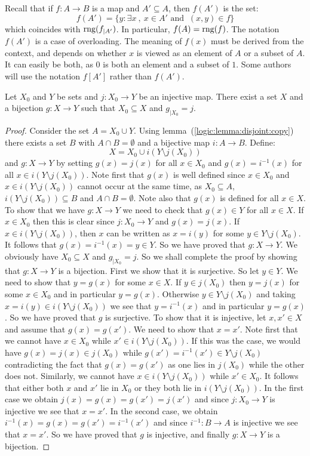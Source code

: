Recall that if $f:A\to B$ is a map and $A'\subseteq A$, then $f(A')$ is the set:
    \[
    f(A')=\{y:\exists x\ ,\ x\in A'\mbox{\ and\ }\ (x,y)\in f\}
    \]
which coincides with $\mbox{\rm rng}(f_{|A'})$. In particular, $f(A)=\mbox{\rm rng}(f)$. The notation $f(A')$ is a case of overloading. The meaning of $f(x)$ must be derived from the context, and depends on whether $x$ is viewed as an element of $A$ or a subset of $A$. It can easily be both, as $0$ is both an element and a subset of $1$. Some authors will use the notation $f[A']$ rather than $f(A')$.

\begin{lemma}\label{logic:lemma:pullback}
Let $X_{0}$ and $Y$ be sets and $j:X_{0}\to Y$ be an injective map. There exist a set $X$ and a bijection $g:X\to Y$ such that $X_{0}\subseteq X$ and $g_{|X_{0}}=j$.
\end{lemma}
\begin{proof}
Consider the set $A=X_{0}\cup Y$. Using lemma~(\ref{logic:lemma:disjoint:copy}) there exists a set $B$ with $A\cap B=\emptyset$ and a bijective map $i:A\to B$.
Define:
    \[
    X=X_{0}\cup i(Y\setminus j(X_{0}))
    \]
and $g:X\to Y$ by setting $g(x)=j(x)$ for all $x\in X_{0}$ and $g(x)=i^{-1}(x)$ for all $x\in i(Y\setminus j(X_{0}))$. Note first that $g(x)$ is well defined  since $x\in X_{0}$ and $x\in i(Y\setminus j(X_{0}))$ cannot occur at the same time, as $X_{0}\subseteq A$, $i(Y\setminus j(X_{0}))\subseteq B$ and $A\cap B=\emptyset$. Note also that $g(x)$ is defined for all $x\in X$. To show that we have $g:X\to Y$ we need to check that $g(x)\in Y$ for all $x\in X$. If $x\in X_{0}$ then this is clear since $j:X_{0}\to Y$ and $g(x)=j(x)$. If $x\in i(Y\setminus j(X_{0}))$, then $x$ can be written as $x=i(y)$ for some $y\in Y\setminus j(X_{0})$. It follows that $g(x)=i^{-1}(x)=y\in Y$. So we have proved that $g:X\to Y$. We obviously have $X_{0}\subseteq X$ and $g_{|X_{0}}=j$. So we shall complete the proof by showing that $g:X\to Y$ is a bijection. First we show that it is surjective. So let $y\in Y$. We need to show that $y=g(x)$ for some $x\in X$. If $y\in j(X_{0})$ then $y=j(x)$ for some $x\in X_{0}$ and in particular $y=g(x)$. Otherwise $y\in Y\setminus j(X_{0})$ and taking $x=i(y)\in i(Y\setminus j(X_{0}))$ we see that $y=i^{-1}(x)$ and in particular $y=g(x)$. So we have proved that $g$ is surjective. To show that it is injective, let $x,x'\in X$ and assume that $g(x)=g(x')$. We need to show that $x=x'$. Note first that we cannot have $x\in X_{0}$ while $x'\in i(Y\setminus j(X_{0}))$. If this was the case, we would have $g(x)=j(x)\in j(X_{0})$ while $g(x')=i^{-1}(x')\in Y\setminus j(X_{0})$ contradicting the fact that $g(x)=g(x')$ as one lies in $j(X_{0})$ while the other does not. Similarly, we cannot have $x\in i(Y\setminus j(X_{0}))$ while $x'\in X_{0}$. It follows that either both $x$ and $x'$ lie in $X_{0}$ or they both lie in $i(Y\setminus j(X_{0}))$. In the first case we obtain $j(x)=g(x)=g(x')=j(x')$ and since $j:X_{0}\to Y$ is injective we see that $x=x'$. In the second case, we obtain $i^{-1}(x)=g(x)=g(x')=i^{-1}(x')$ and since $i^{-1}:B\to A$ is injective we see that $x=x'$. So we have proved that $g$ is injective, and finally $g:X\to Y$ is a bijection.
\end{proof}
